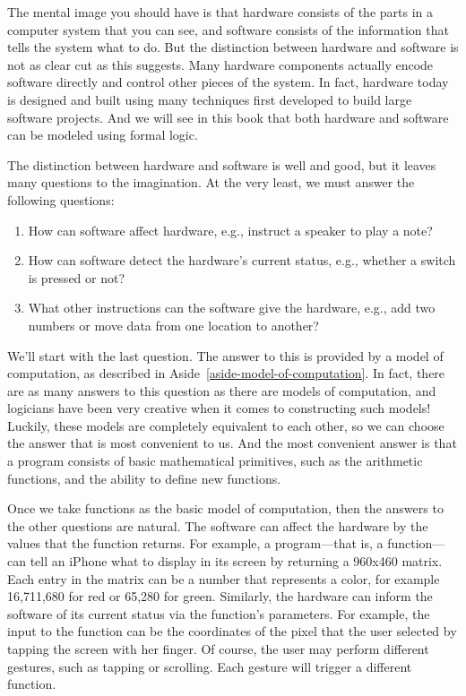 The mental image you should have is that hardware consists of
the parts in a computer system that you can see, and software
consists of the information that tells the system what to do.
But the distinction between hardware and software is not as
clear cut as this suggests. Many hardware components actually
encode software directly and control other pieces of the system. 
In fact, hardware today is designed and built using many techniques
first developed to build large software projects.  And we will see in
this book that both hardware and software can be modeled using formal
logic.

The distinction between hardware and software is well and good,
but it leaves many questions to the imagination.
At the very least, we must answer the following questions:
\begin{enumerate}
\item How can software affect hardware, e.g., instruct a
        speaker to play a note?
\item How can software detect the hardware’s current status, e.g.,
        whether a switch is pressed or not?
\item What other instructions can the software give the hardware,
        e.g., add two numbers or move data from one location to
        another?
\end{enumerate}

We'll start with the last question.  The answer to this is provided by
a model of computation, as described in Aside~\ref{aside-model-of-computation}.
In fact, there are as many answers to this question as there are
models of computation, and logicians have been very creative when it
comes to constructing such models!  Luckily, these models are
completely equivalent to each other, so we can choose the answer
that is most convenient to us.  And the most convenient answer is 
that a program consists of basic mathematical primitives, such as
the arithmetic functions, and the ability to define new functions.

Once we take functions as the basic model of computation, then the
answers to the other questions are natural.  The software can affect
the hardware by the values that the function returns.  For example,
a program---that is, a function---can tell an iPhone what to display
in its screen by returning a 960x460 matrix.  Each entry in the matrix
can be a number that represents a color, for example 16,711,680 for
red or 65,280 for green.  Similarly, the hardware can inform the
software of its current status via the function's parameters.  For
example, the input to the function can be the coordinates of the pixel
that the user selected by tapping the screen with her finger.  Of
course, the user may perform different gestures, such as tapping or
scrolling.  Each gesture will trigger a different function.


